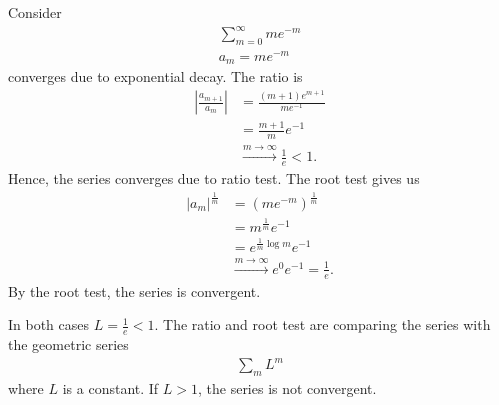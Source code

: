 \begin{enumerate}
	\begin{ex} Consider
		\begin{align*}
		\sum_{m=0}^\infty m e^{-m} \\
		a_m = me^{-m}
		\end{align*}
		converges due to exponential decay. The ratio is
		\begin{align*}
		\left| \frac{a_{m+1}}{a_m} \right| & = \frac{(m+1)e^{m+1}}{m e^{-1}} \\
		& = \frac{m+1}{m} e^{-1} \\
		& \overset{m \to \infty}{\to} \frac 1 e < 1.
		\end{align*}
		Hence, the series converges due to ratio test. The root test gives us
		\begin{align*}
		|a_m|^{\frac 1 m} & = (m e^{-m})^{\frac 1 m} \\
		& = m^{\frac 1 m} e^{-1} \\
		& = e^{\frac 1 m \log m} e^{-1} \\
		& \overset{m\to \infty}{\to} e^0 e^{-1} = \frac 1 e.
		\end{align*}
		By the root test, the series is convergent.
	\end{ex}
	In both cases $L= \frac 1 e < 1$. The ratio and root test are comparing the series with the geometric series
	\begin{align*}
	\sum_m L^m
	\end{align*}
	where $L$ is a constant. If $L>1$, the series is not convergent.
\end{enumerate}




